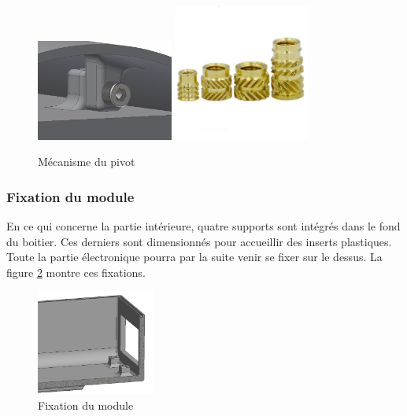 \begin{figure}[H]
    \centering
    \includegraphics[width=0.4\textwidth]{Images/photos_PGA/fixcasquette.PNG}
    \includegraphics[width=0.4\textwidth]{Images/photos_PGA/inserts.jpg}
    \caption{Mécanisme du pivot}
    \label{fig:casquette}
\end{figure}

\subsubsection{Fixation du module}

En ce qui concerne la partie intérieure, quatre supports sont intégrés dans le fond du boitier. Ces derniers 
sont dimensionnés pour accueillir des inserts plastiques. Toute la partie électronique pourra par la 
suite venir se fixer sur le dessus. La figure \ref{fig:fixbase} montre ces fixations.

\begin{figure}[H]
    \centering
    \includegraphics[width=0.35\textwidth]{Images/photos_PGA/fixationbaseModule.PNG}
    \caption{Fixation du module}
    \label{fig:fixbase}
\end{figure}

